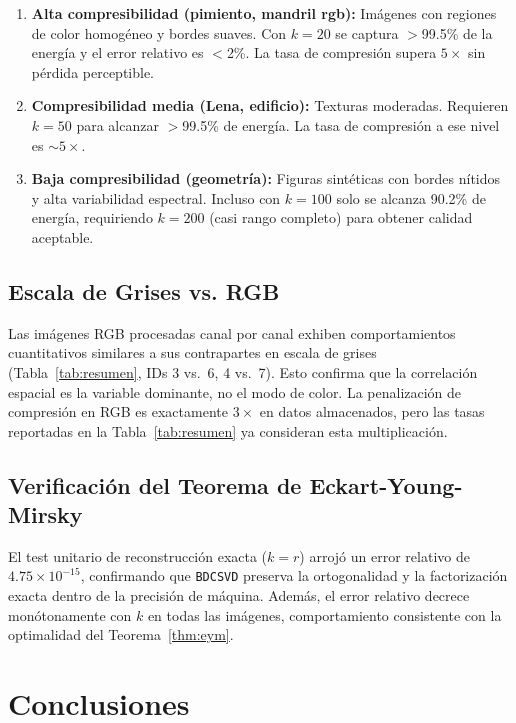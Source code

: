 ﻿\documentclass[12pt,a4paper]{article}
\theoremstyle{definition}
\begin{document}
\begin{enumerate}
    \item \textbf{Alta compresibilidad (pimiento, mandril rgb):} Im\'{a}genes con regiones de color homog\'{e}neo y bordes suaves. Con $k=20$ se captura $>$99.5\% de la energ\'{i}a y el error relativo es $<$2\%. La tasa de compresi\'{o}n supera $5\times$ sin p\'{e}rdida perceptible.

    \item \textbf{Compresibilidad media (Lena, edificio):} Texturas moderadas. Requieren $k=50$ para alcanzar $>$99.5\% de energ\'{i}a. La tasa de compresi\'{o}n a ese nivel es $\sim 5\times$.

    \item \textbf{Baja compresibilidad (geometr\'{i}a):} Figuras sint\'{e}ticas con bordes n\'{i}tidos y alta variabilidad espectral. Incluso con $k=100$ solo se alcanza 90.2\% de energ\'{i}a, requiriendo $k=200$ (casi rango completo) para obtener calidad aceptable.
\end{enumerate}

\subsection{Escala de Grises vs. RGB}

Las im\'{a}genes RGB procesadas canal por canal exhiben comportamientos cuantitativos similares a sus contrapartes en escala de grises (Tabla~\ref{tab:resumen}, IDs 3 vs.\ 6, 4 vs.\ 7). Esto confirma que la correlaci\'{o}n espacial es la variable dominante, no el modo de color. La penalizaci\'{o}n de compresi\'{o}n en RGB es exactamente $3\times$ en datos almacenados, pero las tasas reportadas en la Tabla~\ref{tab:resumen} ya consideran esta multiplicaci\'{o}n.

\subsection{Verificaci\'{o}n del Teorema de Eckart-Young-Mirsky}

El test unitario de reconstrucci\'{o}n exacta ($k=r$) arroj\'{o} un error relativo de $4.75 \times 10^{-15}$, confirmando que \texttt{BDCSVD} preserva la ortogonalidad y la factorizaci\'{o}n exacta dentro de la precisi\'{o}n de m\'{a}quina. Adem\'{a}s, el error relativo decrece mon\'{o}tonamente con $k$ en todas las im\'{a}genes, comportamiento consistente con la optimalidad del Teorema~\ref{thm:eym}.

\section{Conclusiones}\label{sec:conclusiones}
\end{document}
